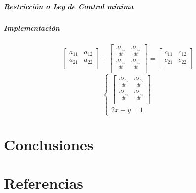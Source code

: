 \documentclass{article}
\begin{document}
\subsubsection*{Restricción o Ley de Control mínima}
\subsubsection*{Implementación}

\newpage
\begin{equation}
    \begin{bmatrix}
    a_{11} & a_{12} \\
    a_{21} & a_{22} \\
    \end{bmatrix} +
    \begin{bmatrix}
    \frac{d\lambda_{a_{s}}}{dt} & \frac{d\lambda_{a_{s}}}{dt}\\ 
    \frac{d\lambda_{a_{s}}}{dt} & \frac{d\lambda_{a_{s}}}{dt}\\ 
    \end{bmatrix} =
    \begin{bmatrix}
    c_{11} & c_{12} \\
    c_{21} & c_{22} \\
    \end{bmatrix}
\end{equation}
\begin{equation}
    \begin{cases}
        \begin{bmatrix}
        \frac{d\lambda_{a_{s}}}{dt} & \frac{d\lambda_{a_{s}}}{dt}\\ 
        \frac{d\lambda_{a_{s}}}{dt} & \frac{d\lambda_{a_{s}}}{dt}\\ 
        \end{bmatrix} \\
        2x - y = 1
    \end{cases}
\end{equation}

\newpage
\part*{Conclusiones}

\newpage
\part*{Referencias}

\label{LastPage}    
\end{document}
